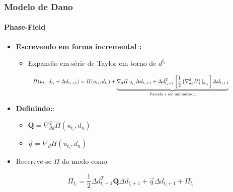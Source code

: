 \documentclass{beamer}
\begin{document}
\begin{frame}
    \frametitle{Modelo de Dano}
    \framesubtitle{Phase-Field}

    \begin{itemize}
        \item \textbf{Escrevendo em forma incremental :}
        \begin{itemize}
            \item Expansão em série de Taylor em torno de \(d^{t_i}\) 
        \end{itemize}
    \end{itemize}

    \begin{equation}
        \scalebox{0.75}{$
        \varPi (u_{t_i},d_{t_i}+\Delta d_{t_i+1}) = \varPi(u_{t_i},d_{t_i}) + \underbrace{\nabla_d \varPi |_{d_{t_i}} \Delta d_{t_i+1} + \Delta d^T_{t_i+1} \left[\frac{1}{2} \left(\nabla^2_{dd} \varPi\right)|_{d_{t_i}}\right] \Delta d_{t_i+1} }_{\text{Parcela a ser minimizada}}
        $}
    \end{equation}
    \begin{itemize}
        \item \textbf{Definindo:}:
        \begin{itemize}
            \item \(\mathbf{Q} = \nabla^2_{dd} \varPi\left(u_{t_i},d_n\right)\)
            \item \(\vec{q} = \nabla_d \varPi\left(u_{t_i},d_n\right)\)
        \end{itemize}
        \item Reecreve-se \(\varPi\) do modo como \textcite{Marengo2021}
    \end{itemize}

    \begin{equation}
        \varPi_{t_i} = \frac{1}{2} \Delta d^T_{t_i+1} \mathbf{Q} \Delta d_{t_i+1} + \vec{q} \Delta d_{t_i+1} + \varPi_{t_i}
    \end{equation}

\end{frame}
\end{document}
